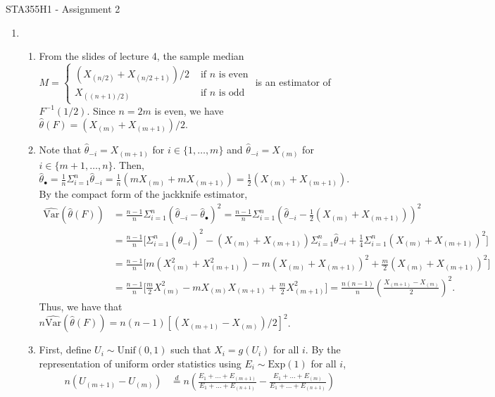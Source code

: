 \documentclass[12pt]{article}
\newcommand{\V}{\text{Var}}
\newcommand{\h}[1]{\hat{#1}}
\begin{document}
\begin{center}
{\Large STA355H1 - Assignment 2}
\end{center}

\begin{enumerate}
    \item
    \begin{enumerate}
        \item From the slides of lecture 4, the sample median $M = \begin{cases} (X_{(n/2)}+X_{(n/2+1)})/2 &\text{ if $n$ is even} \\ X_{((n+1)/2)} &\text{ if $n$ is odd} \end{cases}$ is an estimator of $F^{-1}(1/2)$. Since $n=2m$ is even, we have $\h\theta(F) = (X_{(m)}+X_{(m+1)})/2$.
        \item Note that $\h\theta_{-i} = X_{(m+1)}$ for $i\in\{1,\ldots,m\}$ and $\h\theta_{-i} = X_{(m)}$ for $i\in\{m+1,\ldots,n\}$. Then, $\h\theta_\bullet = \frac{1}{n}\Sigma_{i=1}^n \h\theta_{-i} = \frac{1}{n}(mX_{(m)} + mX_{(m+1)}) = \frac{1}{2}(X_{(m)} + X_{(m+1)})$. By the compact form of the jackknife estimator, \begin{align*}
            \widehat{\V}(\h\theta(F)) &= \frac{n-1}{n}\Sigma_{i=1}^n (\h\theta_{-i}-\h\theta_\bullet)^2 = \frac{n-1}{n}\Sigma_{i=1}^n (\h\theta_{-i}-\frac{1}{2}(X_{(m)} + X_{(m+1)}))^2\\
            &= \frac{n-1}{n}\Big[\Sigma_{i=1}^n (\h\theta_{-i})^2 - (X_{(m)} + X_{(m+1)})\Sigma_{i=1}^n \h\theta_{-i} + \frac{1}{4}\Sigma_{i=1}^n (X_{(m)} + X_{(m+1)})^2\Big]\\
            &= \frac{n-1}{n}\Big[m(X_{(m)}^2 + X_{(m+1)}^2) - m(X_{(m)} + X_{(m+1)})^2 + \frac{m}{2}(X_{(m)} + X_{(m+1)})^2\Big]\\
            &= \frac{n-1}{n}\Big[\frac{m}{2}X_{(m)}^2 - mX_{(m)}X_{(m+1)} + \frac{m}{2}X_{(m+1)}^2\Big] = \frac{n(n-1)}{n} (\frac{X_{(m+1)}-X_{(m)}}{2})^2.
        \end{align*} Thus, we have that $n\widehat{\V}(\h\theta(F)) = n(n-1)[(X_{(m+1)}-X_{(m)})/2]^2$.
        \item First, define $U_i \sim \text{Unif}(0,1)$ such that $X_i = g(U_i)$ for all $i$. By the representation of uniform order statistics using $E_i \sim \text{Exp}(1)$ for all $i$, \begin{align*}
            n(U_{(m+1)}-U_{(m)}) &\overset{d}{=} n(\frac{E_1+\ldots+E_{(m+1)}}{E_1+\ldots+E_{(n+1)}}-\frac{E_1+\ldots+E_{(m)}}{E_1+\ldots+E_{(n+1)}})\\

\end{align*}
\end{enumerate}
\end{enumerate}
\end{document}
